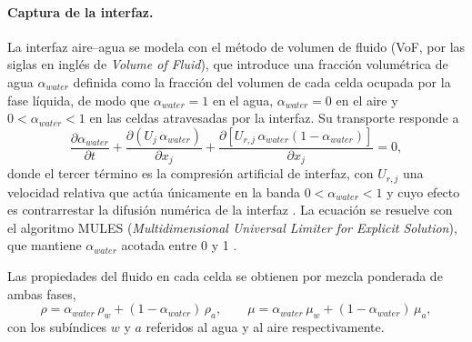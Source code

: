 \paragraph{Captura de la interfaz.}
La interfaz aire--agua se modela con el método de volumen de fluido (VoF, por las siglas en inglés de \emph{Volume of Fluid}), que introduce una fracción volumétrica de agua $\alpha_{water}$ definida como la fracción del volumen de cada celda ocupada por la fase líquida, de modo que $\alpha_{water} = 1$ en el agua, $\alpha_{water} = 0$ en el aire y
$0 < \alpha_{water} < 1$ en las celdas atravesadas por la interfaz. Su
transporte responde a
%
\begin{equation}\label{eq:vof}
    \frac{\partial \alpha_{water}}{\partial t}
    + \frac{\partial (U_j\, \alpha_{water})}{\partial x_j}
    + \frac{\partial \left[ U_{r,j}\, \alpha_{water}
      (1 - \alpha_{water}) \right]}{\partial x_j} = 0 ,
\end{equation}
%
donde el tercer término es la compresión artificial de interfaz, con
$U_{r,j}$ una velocidad relativa que actúa únicamente en la banda
$0 < \alpha_{water} < 1$ y cuyo efecto es contrarrestar la difusión numérica
de la interfaz \citep{rusche2002phd}. La ecuación se resuelve con el algoritmo
MULES (\emph{Multidimensional Universal Limiter for Explicit Solution}), que
mantiene $\alpha_{water}$ acotada entre 0 y 1 \citep{deshpande2012interfoam}.

Las propiedades del fluido en cada celda se obtienen por mezcla
ponderada de ambas fases,
%
\begin{equation}\label{eq:mezcla}
    \rho = \alpha_{water}\,\rho_w + (1 - \alpha_{water})\,\rho_a ,
    \qquad
    \mu = \alpha_{water}\,\mu_w + (1 - \alpha_{water})\,\mu_a ,
\end{equation}
%
con los subíndices $w$ y $a$ referidos al agua y al aire respectivamente.


